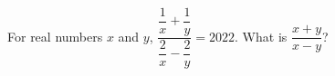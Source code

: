 For real numbers $x$ and $y$, $\dfrac{\dfrac{1}{x}+\dfrac{1}{y}}{\dfrac{2}{x}-\dfrac{2}{y}}=2022$. What is $\dfrac{x+y}{x-y}$?
